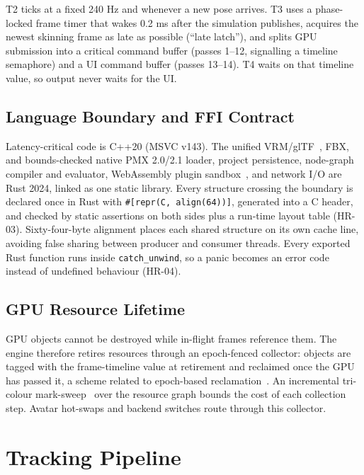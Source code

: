 \documentclass[conference]{IEEEtran}
\begin{document}
T2 ticks at a fixed 240 Hz and whenever a new pose arrives. T3 uses a phase-locked frame timer that wakes 0.2 ms after the simulation publishes, acquires the newest skinning frame as late as possible (``late latch''), and splits GPU submission into a critical command buffer (passes 1--12, signalling a timeline semaphore) and a UI command buffer (passes 13--14). T4 waits on that timeline value, so output never waits for the UI.


\subsection{Language Boundary and FFI Contract}
Latency-critical code is C++20 (MSVC v143). The unified VRM/glTF~\cite{gltf}, FBX, and bounds-checked native PMX 2.0/2.1 loader, project persistence, node-graph compiler and evaluator, WebAssembly plugin sandbox~\cite{wasm,wasmtime}, and network I/O are Rust 2024, linked as one static library. Every structure crossing the boundary is declared once in Rust with \texttt{\#[repr(C, align(64))]}, generated into a C header, and checked by static assertions on both sides plus a run-time layout table (HR-03). Sixty-four-byte alignment places each shared structure on its own cache line, avoiding false sharing between producer and consumer threads. Every exported Rust function runs inside \texttt{catch\_\allowbreak{}unwind}, so a panic becomes an error code instead of undefined behaviour (HR-04).


\subsection{GPU Resource Lifetime}
GPU objects cannot be destroyed while in-flight frames reference them. The engine therefore retires resources through an epoch-fenced collector: objects are tagged with the frame-timeline value at retirement and reclaimed once the GPU has passed it, a scheme related to epoch-based reclamation~\cite{fraser}. An incremental tri-colour mark-sweep~\cite{dijkstra} over the resource graph bounds the cost of each collection step. Avatar hot-swaps and backend switches route through this collector.


\section{Tracking Pipeline}
\end{document}
